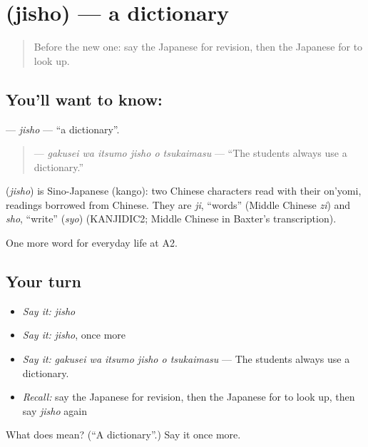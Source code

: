 \section[\texorpdfstring{\ja{じしょ} (jisho)}{じしょ (jisho)}]{ (jisho) — a dictionary}

\label{lesson:JA-C225-jisho}



\begin{quote}
Before the new one: say the Japanese for revision, then the Japanese for to look up.
\end{quote}

\subsection*{You'll want to know: }
\textbf{} — \emph{jisho} — \textquotedblleft{}a dictionary\textquotedblright{}.

\begin{quote}
\textbf{   } — \emph{gakusei wa itsumo jisho o tsukaimasu} — \textquotedblleft{}The students always use a dictionary.\textquotedblright{}
\end{quote}

\begin{cousinweb}
\textbf{} (\emph{jisho}) is Sino-Japanese (kango): two Chinese characters read with their on'yomi, readings borrowed from Chinese. They are \emph{ji}, \textquotedblleft{}words\textquotedblright{} (Middle Chinese \emph{zi}) and \emph{sho}, \textquotedblleft{}write\textquotedblright{} (\emph{syo}) (KANJIDIC2; Middle Chinese in Baxter's transcription).
\end{cousinweb}

\begin{grammarlens}[title={What you've built}]
One more word for everyday life at A2.
\end{grammarlens}

\subsection*{Your turn}
\begin{itemize}
\raggedright
  \item \emph{Say it:} \emph{jisho}
  \item \emph{Say it:} \emph{jisho}, once more
  \item \emph{Say it:} \emph{gakusei wa itsumo jisho o tsukaimasu} — The students always use a dictionary.
  \item \emph{Recall:} say the Japanese for revision, then the Japanese for to look up, then say \emph{jisho} again
\end{itemize}

\begin{tcolorbox}[breakable,colback=teal!4,colframe=teal!35!black,title={Before you move on}]
What does  mean? (\textquotedblleft{}A dictionary\textquotedblright{}.) Say it once more.
\end{tcolorbox}

